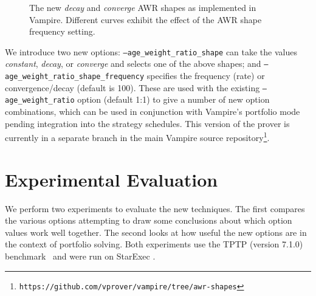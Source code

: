 \documentclass{llncs}
\begin{document}
\begin{figure}[t]
	\caption{The new \emph{decay} and \emph{converge} AWR shapes as implemented in Vampire. Different curves exhibit the effect of the AWR shape frequency setting.}
	\label{fig:decay-and-converge}
\end{figure}

We introduce two new options: \texttt{--age\_weight\_ratio\_shape} can take the values \emph{constant}, \emph{decay}, or \emph{converge} and selects one of the above shapes; and \texttt{--age\_weight\_ratio\_shape\_frequency} specifies the frequency (rate) or convergence/decay (default is 100). These are used with the existing \texttt{--age\_weight\_ratio} option (default 1:1) to give a number of new option combinations, which can be used in conjunction with Vampire's portfolio mode pending integration into the strategy schedules.
This version of the prover is currently in a separate branch in the main Vampire source repository\footnote{\texttt{https://github.com/vprover/vampire/tree/awr-shapes}}.

\section{Experimental Evaluation}
\label{sec:experiments}

We perform two experiments to evaluate the new techniques. The first compares the various options attempting to draw some conclusions about which option values work well together. The second looks at how useful the new options are in the context of portfolio solving. Both experiments use the TPTP (version 7.1.0) benchmark~\cite{tptp} and were run on StarExec \cite{starexec}.
\end{document}
